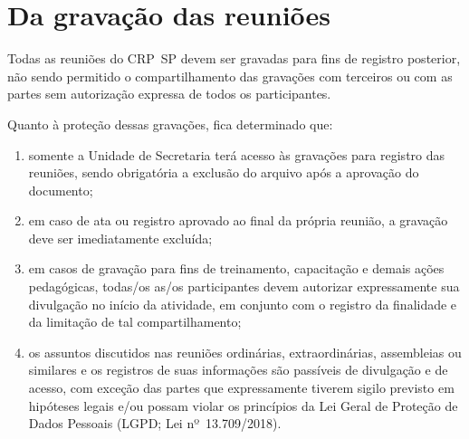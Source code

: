 \chapter{Da gravação das
reuniões}

Todas as reuniões do CRP~SP devem ser gravadas para fins de registro
posterior, não sendo permitido o compartilhamento das gravações com
terceiros ou com as partes sem autorização expressa de todos os
participantes.

Quanto à proteção dessas gravações, fica determinado que:

\begin{enumerate}

\item
    somente a Unidade de Secretaria terá acesso às gravações para registro
    das reuniões, sendo obrigatória a exclusão do arquivo após a aprovação
    do documento;
\item
    em caso de ata ou registro aprovado ao final da própria reunião, a
    gravação deve ser imediatamente excluída;
\item
    em casos de gravação para fins de treinamento, capacitação e demais
    ações pedagógicas, todas/os as/os participantes devem autorizar
    expressamente sua divulgação no início da atividade, em conjunto com o
    registro da finalidade e da limitação de tal compartilhamento;
\item
    os assuntos discutidos nas reuniões ordinárias, extraordinárias,
    assembleias ou similares e os registros de suas informações são
    passíveis de divulgação e de acesso, com exceção das partes que
    expressamente tiverem sigilo previsto em hipóteses legais e/ou possam
    violar os princípios da Lei Geral de Proteção de Dados Pessoais (LGPD;
    Lei nº~13.709/2018).
\end{enumerate}